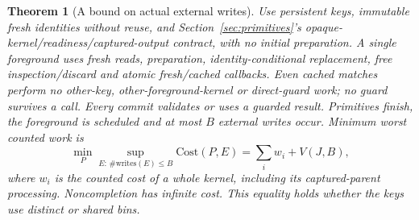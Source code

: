 \documentclass[acmsmall,screen,review,anonymous]{acmart}
\newtheorem{theorem}{Theorem}
\begin{document}
\begin{theorem}[A bound on actual external writes]
\label{thm:writes}
Use persistent keys, immutable fresh identities without reuse, and Section~\ref{sec:primitives}'s opaque-kernel/readiness/captured-output contract, with no initial preparation. A single foreground uses fresh reads, preparation, identity-conditional replacement, free inspection/discard and atomic fresh/cached callbacks. Even cached matches perform no other-key, other-foreground-kernel or direct-guard work; no guard survives a call. Every commit validates or uses a guarded result. Primitives finish, the foreground is scheduled and at most $B$ external writes occur. Minimum worst counted work is
\[
 \min_P\sup_{E:\,\#\mathrm{writes}(E)\le B}\mathrm{Cost}(P,E)
 =\sum_i w_i+V(J,B),
\]
where $w_i$ is the counted cost of a whole kernel, including its captured-parent processing. Noncompletion has infinite cost. This equality holds whether the keys use distinct or shared bins.
\end{theorem}
\end{document}
